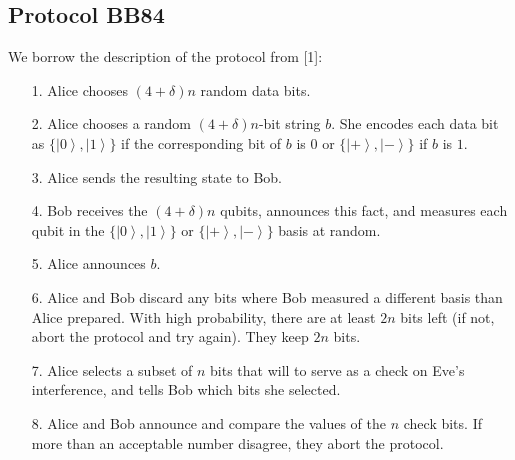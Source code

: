 \documentclass[aps,prd,final,twocolumn,letterpaper]{revtex4}
\newcommand{\ket}[1]{\left|#1\right\rangle}
\begin{document}
\subsection{Protocol BB84}
We borrow the description of the protocol from [1]:
\begin{itemize}
\setlength{\itemsep}{1pt}
\setlength{\parskip}{0pt}
\setlength{\parsep}{0pt}
\item[1.] Alice chooses $(4+\delta)n$ random data bits.
\item[2.] Alice chooses a random $(4+\delta)n$-bit string $b$. She encodes each data bit as $\{\ket{0},\ket{1}\}$ if the corresponding bit of $b$ is $0$ or $\{\ket{+}, \ket{-}\}$ if $b$ is $1$.
\item[3.] Alice sends the resulting state to Bob.
\item[4.] Bob receives the $(4+\delta)n$ qubits, announces this fact, and measures each qubit in the $\{\ket{0}, \ket{1}\}$ or $\{\ket{+}, \ket{-}\}$ basis at random. 
\item[5.] Alice announces $b$.
\item[6.] Alice and Bob discard any bits where Bob measured a different basis than Alice prepared. With high probability, there are at least $2n$ bits left (if not, abort the protocol and try again). They keep $2n$ bits.
\item[7.] Alice selects a subset of $n$ bits that will to serve as a check on Eve's interference, and tells Bob which bits she selected.
\item[8.] Alice and Bob announce and compare the values of the $n$ check bits. If more than an acceptable number disagree, they abort the protocol.
\end{itemize}
\end{document}

